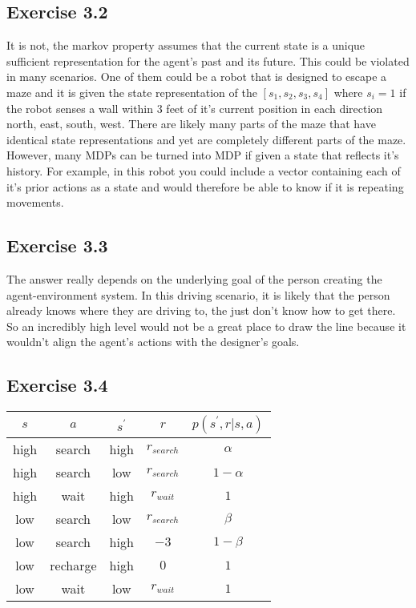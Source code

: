 \subsection{Exercise 3.2}
It is not, the markov property assumes that the current state is a unique sufficient representation for the agent's past and its future. This could be violated in many scenarios. One of them could be a robot that is designed to escape a maze and it is given the state representation of the $[s_1,s_2,s_3,s_4]$ where $s_i = 1$ if the robot senses a wall within 3 feet of it's current position in each direction north, east, south, west. There are likely many parts of the maze that have identical state representations and yet are completely different parts of the maze. However, many MDPs can be turned into MDP if given a state that reflects it's history. For example, in this robot you could include a vector containing each of it's prior actions as a state and would therefore be able to know if it is repeating movements.

\subsection{Exercise 3.3}
The answer really depends on the underlying goal of the person creating the agent-environment system. In this driving scenario, it is likely that the person already knows where they are driving to, the just don't know how to get there. So an incredibly high level would not be a great place to draw the line because it wouldn't align the agent's actions with the designer's goals. 

\subsection{Exercise 3.4}

\begin{tabular}{ c c c c| c}
  \hline
$s$ & $a$ & $s^\prime$ & $r$ & $p(s^\prime,r|s,a)$ \\
\hline
high & search & high & $r_{search}$ & $\alpha$ \\
high & search & low & $r_{search}$ & $1-\alpha$ \\
high & wait & high & $r_{wait}$ & $1$ \\
low & search & low & $r_{search}$ & $\beta$ \\
low & search & high & $-3$ & $1-\beta$ \\
low & recharge & high & $0$ & $1$ \\
low & wait & low & $r_{wait}$ & $1$ \\
\hline
\end{tabular}

